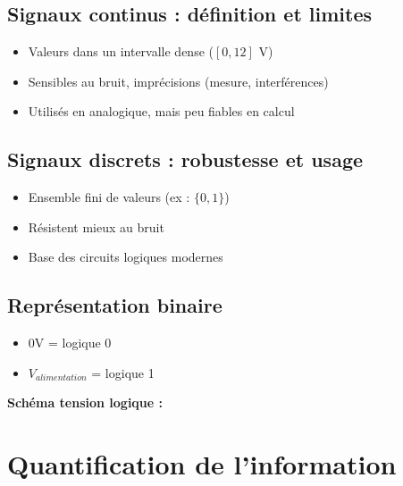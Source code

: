 \documentclass[12pt,a4paper]{article}
\begin{document}
\subsection{Signaux continus : définition et limites}
\begin{itemize}
  \item Valeurs dans un intervalle dense ($[0,12]$ V)
  \item Sensibles au bruit, imprécisions (mesure, interférences)
  \item Utilisés en analogique, mais peu fiables en calcul
\end{itemize}

\subsection{Signaux discrets : robustesse et usage}
\begin{itemize}
  \item Ensemble fini de valeurs (ex : $\{0,1\}$)
  \item Résistent mieux au bruit
  \item Base des circuits logiques modernes
\end{itemize}

\subsection{Représentation binaire}
\begin{itemize}
  \item 0V = logique 0
  \item $V_{alimentation}$ = logique 1
\end{itemize}

\textbf{Schéma tension logique :}
\begin{center}
\end{center}

\section{Quantification de l’information}
\end{document}
